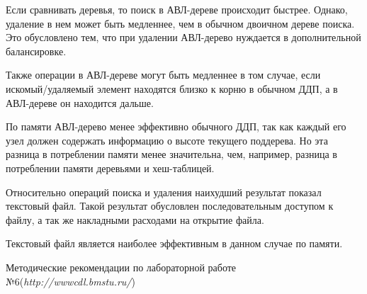\documentclass[a4paper,12pt]{extarticle}
\begin{document}
 Если сравнивать деревья, то поиск в АВЛ-дереве происходит быстрее. Однако, удаление в нем может быть медленнее, чем в обычном двоичном дереве поиска. Это обусловлено тем, что при удалении АВЛ-дерево нуждается в дополнительной балансировке. 
 
 Также операции в АВЛ-дереве могут быть медленнее в том случае, если искомый/удаляемый элемент находятся близко к корню в обычном ДДП, а в АВЛ-дереве он находится дальше.
 
 По памяти АВЛ-дерево менее эффективно обычного ДДП, так как каждый его узел должен содержать информацию о высоте текущего поддерева. Но эта разница в потреблении памяти менее значительна, чем, например, разница в потреблении памяти деревьями и хеш-таблицей.
 
 Относительно операций поиска и удаления наихудший результат показал текстовый файл. Такой результат обусловлен последовательным доступом к файлу, а так же накладными расходами на открытие файла.
 
 Текстовый файл является наиболее эффективным в данном случае по памяти.

\newpage
\begin{thebibliography}{2}
Методические рекомендации по лабораторной работе №6(\emph{http://wwwcdl.bmstu.ru/}) 
\end{thebibliography}
\end{document}

